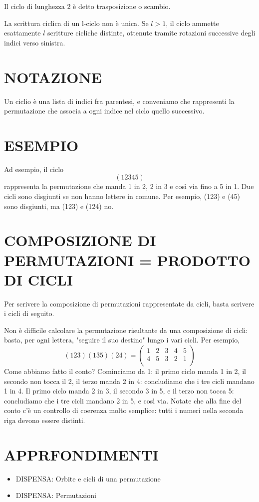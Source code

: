 \documentclass[a4paper,10pt]{article}
\begin{document}
Il ciclo di lunghezza 2 è detto trasposizione o scambio.

La scrittura ciclica di un l-ciclo non è unica. Se $l>1$, il ciclo ammette esattamente $l$ scritture cicliche distinte,
ottenute tramite rotazioni successive degli indici verso sinistra.

\section{NOTAZIONE}
Un ciclio è una lista di indici fra parentesi, e conveniamo che rappresenti la permutazione che associa a ogni indice nel ciclo
quello successivo.

\section{ESEMPIO}
Ad esempio, il ciclo
\[
 (12345)
\]
rappresenta la permutazione che manda 1 in 2, 2 in 3 e così via fino a 5 in 1. Due cicli sono disgiunti se non hanno lettere in comune.
Per esempio, (123) e (45) sono disgiunti, ma (123) e (124) no. 

\section{COMPOSIZIONE DI PERMUTAZIONI = PRODOTTO DI CICLI}
Per scrivere la composizione di permutazioni rappresentate da cicli,
basta scrivere i cicli di seguito.

Non è difficile calcolare la permutazione risultante da una composizione di cicli: basta, per ogni lettera, "seguire il suo destino" lungo
i vari cicli. Per esempio,
\[
 (123)(135)(24) = \left(\begin{array}{ccccc}
                         1 & 2 & 3 & 4 & 5 \\
                         4 & 5 & 3 & 2 & 1 \\
                        \end{array} \right)
\]
Come abbiamo fatto il conto? Cominciamo da 1: il primo ciclo manda 1 in 2, il secondo non tocca il 2, il terzo manda 2 in 4: concludiamo
che i tre cicli mandano 1 in 4. Il primo ciclo manda 2 in 3, il secondo 3 in 5, e il terzo non tocca 5: concludiamo che i tre cicli
mandano 2 in 5, e così via. Notate che alla fine del conto c'è un controllo di coerenza molto semplice:  tutti i numeri
nella seconda riga devono essere distinti.

\section{APPRFONDIMENTI}
\begin{itemize}
 \item DISPENSA: Orbite e cicli di una permutazione \cite{permutazione4}
 \item DISPENSA: Permutazioni \cite{permutazione2}
\end{itemize}



\end{document}
